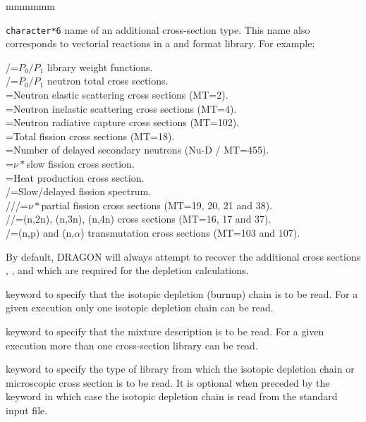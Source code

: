 \begin{ListeDeDescription}{mmmmmm}
\item[\dusa{HEDIT}] {\tt character*6} name of an additional
cross-section type. This name also corresponds to vectorial reactions in a
 and
 format library. For example:

/=$P_0/P_1$ library weight functions.\\
/=$P_0/P_1$ neutron total cross sections.\\
=Neutron elastic scattering cross sections (MT=2).\\
=Neutron inelastic scattering cross sections (MT=4).\\
=Neutron radiative capture cross sections (MT=102).\\
=Total fission cross sections (MT=18).\\
=Number of delayed secondary neutrons (Nu-D / MT=455).\\
=$\nu*$slow fission cross section.\\
=Heat production cross section.\\
/=Slow/delayed fission spectrum.\\
///=$\nu*$partial fission cross sections (MT=19, 20, 21 and 38).\\ 
//=(n,2n), (n,3n), (n,4n) cross sections (MT=16, 17 and 37).\\
/=(n,p) and (n,$\alpha$) transmutation cross sections (MT=103 and 107).

By default, DRAGON will always attempt to recover the additional cross sections
, ,  and  which are required for the depletion
calculations. 

\item[\moc{DEPL}] keyword to specify that the isotopic depletion (burnup)
chain is to be read. For a given  execution only one isotopic
depletion chain can be read. 

\item[\moc{MIXS}] keyword to specify that the mixture description is to be
read. For a given  execution more than one cross-section library can
be read. 

\item[\moc{LIB:}] keyword to specify the type of library from which the
isotopic depletion chain or microscopic cross section is to be read. It is
optional when preceded by the keyword  in which case the isotopic
depletion chain is read from the standard input file. 


\end{ListeDeDescription}
